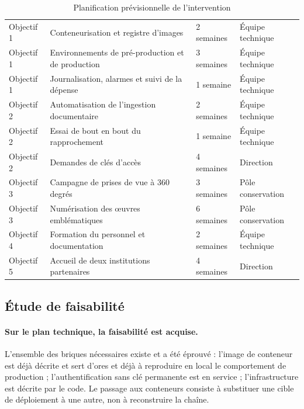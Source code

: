 \begin{table}[!ht]
\centering
\caption{Planification prévisionnelle de l'intervention}
\label{tab:planning}
\small
\begin{tabularx}{\textwidth}{|C{1.9cm}|X|C{2.2cm}|C{2.6cm}|}
\hline
{}
 &  &  &  \\ \hline
Objectif 1 & Conteneurisation et registre d'images & 2 semaines & Équipe technique \\ \hline
Objectif 1 & Environnements de pré-production et de production & 3 semaines & Équipe technique \\ \hline
Objectif 1 & Journalisation, alarmes et suivi de la dépense & 1 semaine & Équipe technique \\ \hline
Objectif 2 & Automatisation de l'ingestion documentaire & 2 semaines & Équipe technique \\ \hline
Objectif 2 & Essai de bout en bout du rapprochement & 1 semaine & Équipe technique \\ \hline
Objectif 2 & Demandes de clés d'accès & 4 semaines & Direction \\ \hline
Objectif 3 & Campagne de prises de vue à 360 degrés & 3 semaines & Pôle conservation \\ \hline
Objectif 3 & Numérisation des œuvres emblématiques & 6 semaines & Pôle conservation \\ \hline
Objectif 4 & Formation du personnel et documentation & 2 semaines & Équipe technique \\ \hline
Objectif 5 & Accueil de deux institutions partenaires & 4 semaines & Direction \\ \hline
\end{tabularx}
\end{table}

\subsection{Étude de faisabilité}

\paragraph{Sur le plan technique, la faisabilité est acquise.} L'ensemble des briques nécessaires existe et a été éprouvé :
l'image de conteneur est déjà décrite et sert d'ores et déjà à reproduire en
local le comportement de production ; l'authentification sans clé permanente est
en service ; l'infrastructure est décrite par le code. Le passage aux conteneurs
consiste à substituer une cible de déploiement à une autre, non à reconstruire
la chaîne.

